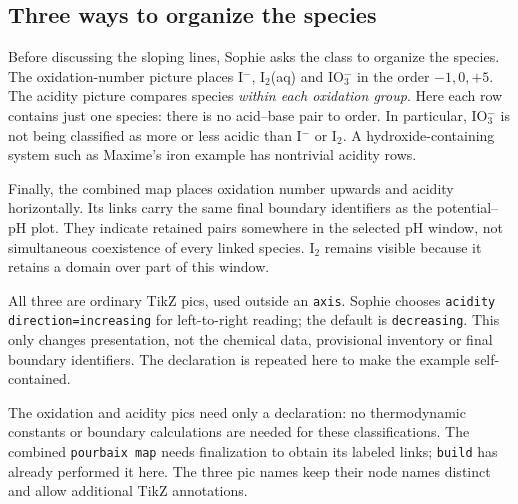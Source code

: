 \documentclass[a4paper,11pt]{ltxdoc}
\begin{document}
\subsection{Three ways to organize the species}
Before discussing the sloping lines, Sophie asks the class to organize the
species. The oxidation-number picture places I$^-$, I$_2$(aq) and IO$_3^-$
in the order $-1,0,+5$. The acidity picture compares species \emph{within each
oxidation group}. Here each row contains just one species: there is no acid--base
pair to order. In particular, IO$_3^-$ is not being classified as more or less
acidic than I$^-$ or I$_2$. A hydroxide-containing system such as Maxime's iron
example has nontrivial acidity rows.

Finally, the combined map places oxidation number upwards and acidity
horizontally. Its links carry the same final boundary identifiers as the
potential--pH plot. They indicate retained pairs somewhere in the selected pH
window, not simultaneous coexistence of every linked species. I$_2$ remains
visible because it retains a domain over part of this window.

All three are ordinary TikZ pics, used outside an \texttt{axis}. Sophie chooses
\texttt{acidity direction=increasing} for left-to-right reading; the default is
\texttt{decreasing}. This only changes presentation, not the chemical data,
provisional inventory or final boundary identifiers. The declaration is repeated
here to make the example self-contained.

\begin{codeexample}[width=0pt]
\end{codeexample}

The oxidation and acidity pics need only a declaration: no thermodynamic
constants or boundary calculations are needed for these classifications.
The combined \texttt{pourbaix map} needs finalization to obtain its labeled
links; \texttt{build} has already performed it here. The three pic names keep
their node names distinct and allow additional TikZ annotations.
\end{document}
